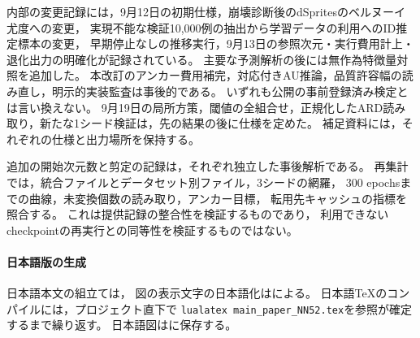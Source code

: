 \documentclass[11pt,a4paper]{ltjsarticle}
\begin{document}
内部の変更記録には，9月12日の初期仕様，崩壊診断後のdSpritesのベルヌーイ尤度への変更，
実現不能な検証10,000例の抽出から学習データの利用へのID推定標本の変更，
早期停止なしの推移実行，9月13日の参照次元・実行費用計上・退化出力の明確化が記録されている。
主要な予測解析の後には無作為特徴量対照を追加した。
本改訂のアンカー費用補完，対応付きAU推論，品質許容幅の読み直し，明示的実装監査は事後的である。
いずれも公開の事前登録済み検定とは言い換えない。
9月19日の局所方策，閾値の全組合せ，正規化したARD読み取り，新たな1シード検証は，先の結果の後に仕様を定めた。
補足資料には，それぞれの仕様と出力場所を保持する。

追加の開始次元数と剪定の記録は，それぞれ独立した事後解析である。
再集計では，統合ファイルとデータセット別ファイル，3シードの網羅，
300 epochsまでの曲線，未変換個数の読み取り，アンカー目標，
転用先キャッシュの指標を照合する。
これは提供記録の整合性を検証するものであり，
利用できないcheckpointの再実行との同等性を検証するものではない。

\paragraph{日本語版の生成}
日本語本文の組立ては，
図の表示文字の日本語化はによる。
日本語TeXのコンパイルには，プロジェクト直下で
\texttt{lualatex main\_paper\_NN52.tex}を参照が確定するまで繰り返す。
日本語図はに保存する。
\end{document}
